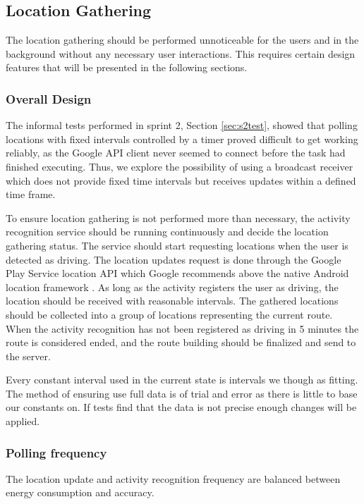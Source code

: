 \subsection{Location Gathering}\label{section:s3locgath}
The location gathering should be performed unnoticeable for the users and in the background without any necessary user interactions. 
This requires certain design features that will be presented in the following sections. 


\subsubsection{Overall Design}
The informal tests performed in sprint 2, Section \ref{sec:s2test}, showed that polling locations with fixed intervals controlled by a timer proved difficult to get working reliably, as the Google API client never seemed to connect before the task had finished executing. 
Thus, we explore the possibility of using a broadcast receiver which does not provide fixed time intervals but receives updates within a defined time frame.

To ensure location gathering is not performed more than necessary, the activity recognition service should be running continuously and decide the location gathering status.
The service should start requesting locations when the user is detected as driving. 
The location updates request is done through the Google Play Service location API which Google recommends above the native Android location framework \cite{apploc}.
As long as the activity registers the user as driving, the location should be received with reasonable intervals.
The gathered locations should be collected into a group of locations representing the current route.
When the activity recognition has not been registered as driving in 5 minutes the route is considered ended, and the route building should be finalized and send to the server.


Every constant interval used in the current state is intervals we though as fitting.
The method of ensuring use full data is of trial and error as there is little to base our constants on.
If tests find that the data is not precise enough changes will be applied.

\subsubsection{Polling frequency}
The location update and activity recognition frequency are balanced between energy consumption and accuracy.

